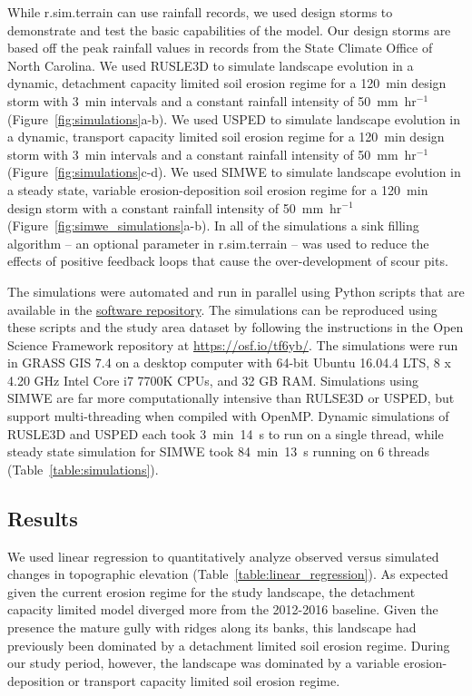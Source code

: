 \documentclass[gmd, manuscript]{copernicus}
\begin{document}
While r.sim.terrain can use rainfall records,
we used design storms to demonstrate and test 
the basic capabilities of the model. 
Our design storms are based off the peak rainfall values
in records from the State Climate Office of North Carolina.
We used RUSLE3D to simulate landscape evolution
in a dynamic, detachment capacity limited soil erosion regime
for a 120~\unit{min} design storm
with 3~\unit{min} intervals 
and a constant rainfall intensity of 50~\unit{mm~hr}$^{-1}$
(Figure~\ref{fig:simulations}a-b).
%
We used USPED to simulate landscape evolution
in a dynamic, transport capacity limited soil erosion regime
for a 120~\unit{min} design storm
with 3~\unit{min} intervals 
and a constant rainfall intensity of 50~\unit{mm~hr}$^{-1}$
(Figure~\ref{fig:simulations}c-d).
%
We used SIMWE to simulate landscape evolution
in a steady state, variable erosion-deposition soil erosion regime
for a 120~\unit{min} design storm
with a constant rainfall intensity of 50~\unit{mm~hr}$^{-1}$
(Figure~\ref{fig:simwe_simulations}a-b). 
%
In all of the simulations 
a sink filling algorithm
-- an optional parameter in r.sim.terrain -- 
was used to reduce the effects of positive feedback loops
that cause the over-development of scour pits. 

The simulations were automated and run in parallel
using Python scripts that are available in the 
\href{https://github.com/baharmon/landscape_evolution}{software repository}.
The simulations can be reproduced using these scripts
and the study area dataset 
by following the instructions 
in the Open Science Framework repository 
at \url{https://osf.io/tf6yb/}.
The simulations were run 
in GRASS GIS 7.4 
on a desktop computer 
with 64-bit Ubuntu 16.04.4 LTS,
8 x 4.20 GHz Intel Core i7 7700K CPUs,
and 32 GB RAM. 
Simulations using SIMWE 
are far more computationally intensive
than RULSE3D or USPED, 
but support multi-threading 
when compiled with OpenMP. 
Dynamic simulations of RUSLE3D and USPED each took
3~\unit{min}~14~\unit{s} to run on a single thread, 
while steady state simulation for SIMWE took 
84~\unit{min}~13~\unit{s} running on 6 threads
(Table~\ref{table:simulations}).


\subsection{Results}

We used linear regression to quantitatively analyze 
observed versus simulated changes in topographic elevation
(Table~\ref{table:linear_regression}).
%
As expected given the current erosion regime 
for the study landscape,
the detachment capacity limited model 
diverged more from the 2012-2016 baseline. 
%
Given the presence the mature gully 
with ridges along its banks,
this landscape had previously been dominated by 
a detachment limited soil erosion regime.
During our study period, however, 
the landscape was dominated 
by a variable erosion-deposition 
or transport capacity limited soil erosion regime.
\end{document}
